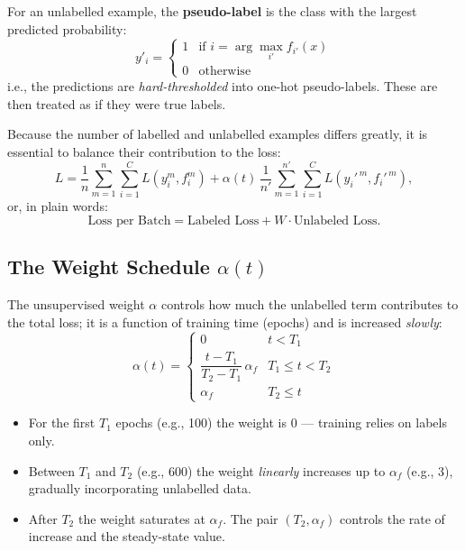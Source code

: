 \documentclass[11pt,a4paper]{article}
\theoremstyle{definition}
\theoremstyle{plain}
\theoremstyle{remark}
\begin{document}
For an unlabelled example, the \textbf{pseudo-label} is the class with the largest predicted probability:
\begin{equation}
    y'_i = \begin{cases} 1 & \text{if } i = \arg\max_{i'} f_{i'}(x) \\ 0 & \text{otherwise}\end{cases}
\end{equation}
i.e., the predictions are \emph{hard-thresholded} into one-hot pseudo-labels. These are then treated as if they were true labels.

Because the number of labelled and unlabelled examples differs greatly, it is essential to balance their contribution to the loss:
\begin{equation}
    L = \frac{1}{n}\sum_{m=1}^{n}\sum_{i=1}^{C} L\!\left(y_i^m, f_i^m\right) + \alpha(t)\,\frac{1}{n'}\sum_{m=1}^{n'}\sum_{i=1}^{C} L\!\left(y_i'^{\,m}, f_i'^{\,m}\right),
\end{equation}
or, in plain words:
\begin{equation*}
    \text{Loss per Batch} = \text{Labeled Loss} + W\cdot \text{Unlabeled Loss}.
\end{equation*}

\subsection{The Weight Schedule $\alpha(t)$}

The unsupervised weight $\alpha$ controls how much the unlabelled term contributes to the total loss; it is a function of training time (epochs) and is increased \emph{slowly}:
\begin{equation}
    \alpha(t) = \begin{cases} 0 & t < T_1 \\ \dfrac{t - T_1}{T_2 - T_1}\,\alpha_f & T_1 \leq t < T_2 \\ \alpha_f & T_2 \leq t \end{cases}
\end{equation}

\begin{itemize}
    \item For the first $T_1$ epochs (e.g., 100) the weight is $0$ --- training relies on labels only.
    \item Between $T_1$ and $T_2$ (e.g., 600) the weight \emph{linearly} increases up to $\alpha_f$ (e.g., 3), gradually incorporating unlabelled data.
    \item After $T_2$ the weight saturates at $\alpha_f$. The pair $(T_2,\alpha_f)$ controls the rate of increase and the steady-state value.
\end{itemize}
\end{document}
